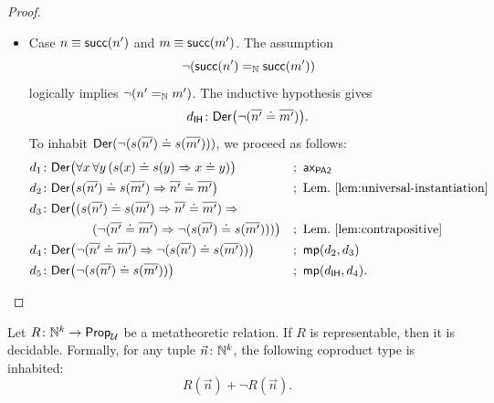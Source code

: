 \begin{proof}
\begin{enumerate}[a),font=\upshape]
\begin{itemize}
            \item Case $n\equiv\mathsf{succ}(n')$ and $m\equiv\mathsf{succ}(m')$. The assumption 
            \[
                \neg(\mathsf{succ}(n')\mathrel{=_{\mathbb{N}}}\mathsf{succ}(m'))
            \]
            logically implies $\neg(n'\mathrel{=_{\mathbb{N}}} m')$. The inductive hypothesis gives
            \[
                d_{\fun{IH}}\colon\fun{Der}\bigl(
                    \neg(\num{n'}\doteq\num{m'})
                \bigr).
            \]
            To inhabit $\mathsf{Der}(\neg(s({\overline{n'}})\doteq s({\overline{m'}})))$, we proceed as follows:
            {\small
            \begin{align*}
                d_1&\colon\fun{Der}\bigl(
                    \forall x\,\forall y\,(s(x)\doteq s(y)\imp x\doteq y)
                \bigr)
                    &&;\ \fun{ax}_{\fun{PA2}}\\
                d_2&\colon\fun{Der}\bigl(
                    s(\num{n'})\doteq s(\num{m'})
                    \imp
                    \num{n'}\doteq\num{m'}
                \bigr)
                    &&;\ \text{Lem.~\ref{lem:universal-instantiation}}\\
                d_3&\colon\fun{Der}\bigl(
                    (
                        s(\num{n'})\doteq s(\num{m'})
                        \imp
                        \num{n'}\doteq\num{m'}
                    )
                    \imp\\
                    &\qquad\qquad(
                        \neg(\num{n'}\doteq\num{m'})
                        \imp
                        \neg(s(\num{n'})\doteq s(\num{m'}))
                    )
                \bigr)
                    &&;\ \text{Lem.~\ref{lem:contrapositive}}\\
                d_4&\colon\fun{Der}\bigl(
                    \neg(\num{n'}\doteq\num{m'})
                    \imp
                    \neg(s(\num{n'})\doteq s(\num{m'}))
                \bigr)
                    &&;\ \fun{mp}(d_2,d_3)\\
                d_5&\colon\fun{Der}\bigl(
                    \neg(s(\num{n'})\doteq s(\num{m'}))
                \bigr)
                    &&;\ \fun{mp}(d_{\fun{IH}},d_4).
            \end{align*}}
        \end{itemize}\qedhere
    \end{enumerate}
\end{proof}

\begin{prop}
    \label{prop:representable-decidable}
    Let $R\colon\N^k\to\fun{Prop}_\univ$ be a metatheoretic relation. If $R$ is representable, then it is decidable. Formally, for any tuple $\vec{n}\colon\N^k$, the following coproduct type is inhabited:
    \[
        R(\vec n)+\neg R(\vec n).
    \]
\end{prop}

